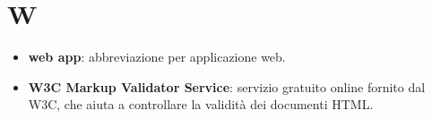 \section{W}
\begin{itemize}
	\item \textbf{web app}: abbreviazione per applicazione web.
	\item \textbf{W3C Markup Validator Service}: servizio gratuito online fornito dal W3C, che aiuta a controllare la validità dei documenti HTML.
\end{itemize}